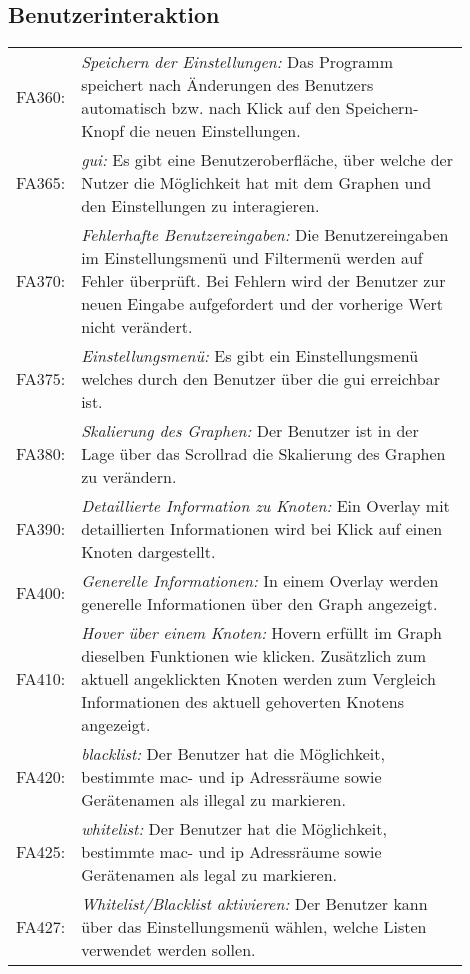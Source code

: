 \subsection{Benutzerinteraktion}

\begin{longtable}{lp{0.9\linewidth}}

FA360: & \textit{Speichern der Einstellungen: }Das Programm speichert nach Änderungen des Benutzers automatisch bzw. nach Klick auf den Speichern-Knopf die neuen Einstellungen. \\

FA365: & \textit{\gls{gui}: }Es gibt eine Benutzeroberfläche, über welche der Nutzer die Möglichkeit hat mit dem Graphen und den Einstellungen zu interagieren. \\

FA370: & \textit{Fehlerhafte Benutzereingaben: }Die Benutzereingaben im Einstellungsmenü und Filtermenü werden auf Fehler überprüft. Bei Fehlern wird der Benutzer zur neuen Eingabe aufgefordert und der vorherige Wert nicht verändert. \\

FA375: & \textit{Einstellungsmenü: }Es gibt ein Einstellungsmenü welches durch den Benutzer über die \gls{gui} erreichbar ist. \\

FA380: & \textit{Skalierung des Graphen: }Der Benutzer ist in der Lage über das Scrollrad die Skalierung des Graphen zu verändern. \\

FA390: & \textit{Detaillierte Information zu Knoten: }Ein Overlay mit detaillierten Informationen wird bei Klick auf einen Knoten dargestellt. \\

FA400: & \textit{Generelle Informationen: }In einem Overlay werden generelle Informationen über den Graph angezeigt. \\

FA410: & \textit{Hover über einem Knoten: }Hovern erfüllt im Graph dieselben Funktionen wie klicken. Zusätzlich zum aktuell angeklickten Knoten werden zum Vergleich Informationen des aktuell gehoverten Knotens angezeigt. \\

FA420: & \textit{\gls{blacklist}: }Der Benutzer hat die Möglichkeit, bestimmte \gls{mac}- und \gls{ip} Adressräume sowie Gerätenamen als illegal zu markieren. \\

FA425: & \textit{\gls{whitelist}: }Der Benutzer hat die Möglichkeit, bestimmte \gls{mac}- und \gls{ip} Adressräume sowie Gerätenamen als legal zu markieren. \\

FA427: & \textit{Whitelist/Blacklist aktivieren: }Der Benutzer kann über das Einstellungsmenü wählen, welche Listen verwendet werden sollen. \\

\end{longtable}

